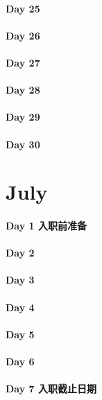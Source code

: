 \documentclass[UTF8,a4paper,8pt]{ctexart}
\begin{document}
 	 \paragraph{Day 25      \quad     }
 	 \paragraph{Day 26      \quad     }
 	 \paragraph{Day 27      \quad     }
 	 \paragraph{Day 28      \quad     }
 	 \paragraph{Day 29      \quad     }   
 	 \paragraph{Day 30      \quad     }
\section{July}
 	 \paragraph{Day 1   入职前准备    \quad     }
 	 \paragraph{Day 2       \quad     }
 	 \paragraph{Day 3       \quad     }
 	 \paragraph{Day 4       \quad     }
 	 \paragraph{Day 5       \quad     }
 	 \paragraph{Day 6       \quad     }
 	 \paragraph{Day 7   入职截止日期    \quad     }
\end{document}
